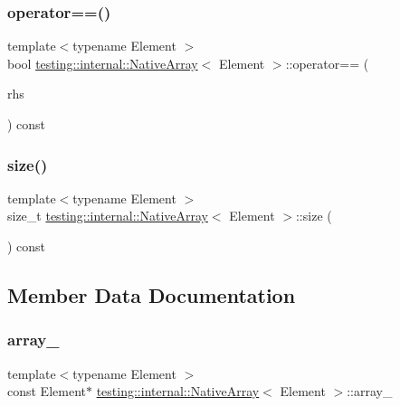 \subsubsection{\texorpdfstring{operator==()}{operator==()}}
{\footnotesize\ttfamily template$<$typename Element $>$ \\
bool \hyperlink{classtesting_1_1internal_1_1NativeArray}{testing\+::internal\+::\+Native\+Array}$<$ Element $>$\+::operator== (\begin{DoxyParamCaption}\item[{const \hyperlink{classtesting_1_1internal_1_1NativeArray}{Native\+Array}$<$ Element $>$ \&}]{rhs }\end{DoxyParamCaption}) const\hspace{0.3cm}{\ttfamily [inline]}}

\mbox{\label{classtesting_1_1internal_1_1NativeArray_af96a4a5ca0cdd5d163c47a081f08bd89}} 
\subsubsection{\texorpdfstring{size()}{size()}}
{\footnotesize\ttfamily template$<$typename Element $>$ \\
size\+\_\+t \hyperlink{classtesting_1_1internal_1_1NativeArray}{testing\+::internal\+::\+Native\+Array}$<$ Element $>$\+::size (\begin{DoxyParamCaption}{ }\end{DoxyParamCaption}) const\hspace{0.3cm}{\ttfamily [inline]}}



\subsection{Member Data Documentation}
\mbox{\label{classtesting_1_1internal_1_1NativeArray_adadc025fbbbd43904d4036991019f18f}} 
\subsubsection{\texorpdfstring{array\+\_\+}{array\_}}
{\footnotesize\ttfamily template$<$typename Element $>$ \\
const Element$\ast$ \hyperlink{classtesting_1_1internal_1_1NativeArray}{testing\+::internal\+::\+Native\+Array}$<$ Element $>$\+::array\+\_\+\hspace{0.3cm}{\ttfamily [private]}}

